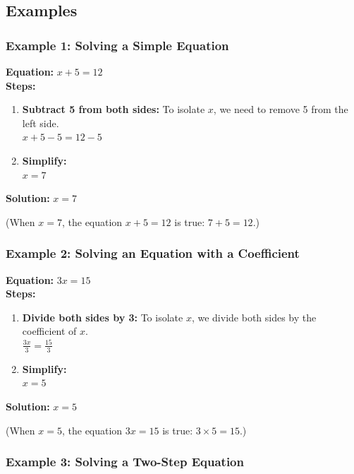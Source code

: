\documentclass[12pt]{article}
\begin{document}
\subsection*{Examples}

\subsubsection*{Example 1: Solving a Simple Equation}

\textbf{Equation:} \( x + 5 = 12 \)\\

\textbf{Steps:}

\begin{enumerate}
    \item \textbf{Subtract 5 from both sides:} To isolate \( x \), we need to remove 5 from the left side. \\
    \( x + 5 - 5 = 12 - 5 \)
    \item \textbf{Simplify:} \\
    \( x = 7 \)
\end{enumerate}

\textbf{Solution:} \( x = 7 \)

(When \( x = 7 \), the equation \( x + 5 = 12 \) is true: \( 7+ 5 = 12 \).)

\newpage

\subsubsection*{Example 2: Solving an Equation with a Coefficient}

\textbf{Equation:} \( 3x = 15 \)\\

\textbf{Steps:}

\begin{enumerate}
    \item \textbf{Divide both sides by 3:} To isolate \( x \), we divide both sides by the coefficient of \( x \). \\
    \( \frac{3x}{3} = \frac{15}{3} \)
    \item \textbf{Simplify:} \\
    \( x = 5 \)
\end{enumerate}

\textbf{Solution:} \( x = 5 \)

(When \( x = 5 \), the equation \( 3x = 15 \) is true: \( 3 \times 5 = 15 \).)

\subsubsection*{Example 3: Solving a Two-Step Equation}
\end{document}
